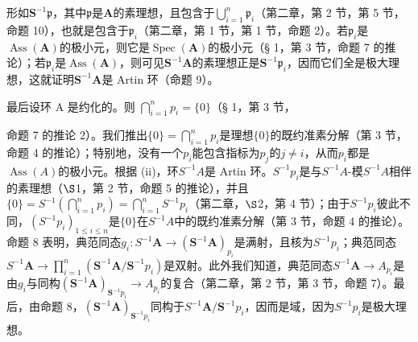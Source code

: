 形如\(\mathbf{S}^{-1}\mathfrak{p}\)，其中\(\mathfrak{p}\)是\(\mathbf{A}\)的素理想，且包含于\(\bigcup_{i=1}^{n} \mathfrak{p}_i\)（第二章，第 2 节，第 5 节，命题 10），也就是包含于\(\mathfrak{p}_i\)（第二章，第 1 节，第 1 节，命题 2）。若\(\mathfrak{p}_i\)是\(\operatorname{Ass}(\mathbf{A})\)的极小元，则它是\(\operatorname{Spec}(\mathbf{A})\)的极小元（§ 1，第 3 节，命题 7 的推论）；若\(\mathfrak{p}_i\)是\(\operatorname{Ass}(\mathbf{A})\)，则可见\(\mathbf{S}^{-1}\mathbf{A}\)的素理想正是\(\mathbf{S}^{-1}\mathfrak{p}_i\)，因而它们全是极大理想，这就证明\(\mathbf{S}^{-1}\mathbf{A}\)是 Artin 环（命题 9）。

最后设环 A 是约化的。则 \(\bigcap_{i=1}^{n} p_i = \{0\}\)（§ 1，第 3 节，

命题 7 的推论 2）。我们推出\(\{0\} = \bigcap_{i=1}^{n} p_i\)是理想\(\{0\}\)的既约准素分解（第 3 节，命题 4 的推论）；特别地，没有一个\(p_i\)能包含指标为\(p_j\)的\(j \neq i\)，从而\(p_i\)都是\(\operatorname{Ass}(A)\)的极小元。根据 (ii)，环\(S^{-1}A\)是 Artin 环。\(S^{-1}p_i\)是与\(S^{-1}A\)-模\(S^{-1}A\)相伴的素理想（\(\S\)1，第 2 节，命题 5 的推论），并且\(\{0\} = S^{-1}\left(\bigcap_{i=1}^{n} p_i\right) = \bigcap_{i=1}^{n} S^{-1}p_i\)（第二章，\(\S\)2，第 4 节）；由于\(S^{-1}p_i\)彼此不同，\((S^{-1}p_i)_{1 \leqslant i \leqslant n}\)是\(\{0\}\)在\(S^{-1}A\)中的既约准素分解（第 3 节，命题 4 的推论）。命题 8 表明，典范同态\(g_{i} \colon S^{-1}\mathbf{A} \to (\mathbf{S}^{-1}\mathbf{A})_{p_{i}}\)是满射，且核为\(S^{-1}p_{i}\)；典范同态\(S^{-1}\mathbf{A} \to \prod_{i=1}^{n} (\mathbf{S}^{-1}\mathbf{A}/\mathbf{S}^{-1}p_{i})\)是双射。此外我们知道，典范同态\(S^{-1}\mathbf{A} \to A_{p_{i}}\)是由\(g_{i}\)与同构\((\mathbf{S}^{-1}\mathbf{A})_{\mathbf{S}^{-1}p_{i}} \to A_{p_{i}}\)的复合（第二章，第 2 节，第 3 节，命题 7）。最后，由命题 8，\((\mathbf{S}^{-1}\mathbf{A})_{\mathbf{S}^{-1}p_{i}}\)同构于\(S^{-1}\mathbf{A}/\mathbf{S}^{-1}p_{i}\)，因而是域，因为\(S^{-1}p_{i}\)是极大理想。

